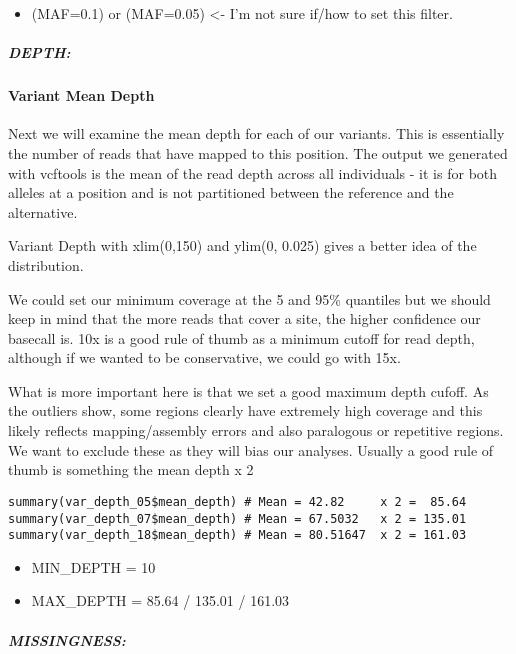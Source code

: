 \documentclass[
]{article}
\providecommand{\tightlist}{%
  \setlength{\itemsep}{0pt}\setlength{\parskip}{0pt}}
\begin{document}
\begin{itemize}
\tightlist
\item
  (MAF=0.1) or (MAF=0.05) \textless- I'm not sure if/how to set this
  filter.
\end{itemize}

\hypertarget{depth-1}{%
\subparagraph{DEPTH:}\label{depth-1}}

\hypertarget{variant-mean-depth}{%
\paragraph{Variant Mean Depth}\label{variant-mean-depth}}

Next we will examine the mean depth for each of our variants. This is
essentially the number of reads that have mapped to this position. The
output we generated with vcftools is the mean of the read depth across
all individuals - it is for both alleles at a position and is not
partitioned between the reference and the alternative.

Variant Depth with xlim(0,150) and ylim(0, 0.025) gives a better idea of
the distribution.

We could set our minimum coverage at the 5 and 95\% quantiles but we
should keep in mind that the more reads that cover a site, the higher
confidence our basecall is. 10x is a good rule of thumb as a minimum
cutoff for read depth, although if we wanted to be conservative, we
could go with 15x.

What is more important here is that we set a good maximum depth cufoff.
As the outliers show, some regions clearly have extremely high coverage
and this likely reflects mapping/assembly errors and also paralogous or
repetitive regions. We want to exclude these as they will bias our
analyses. Usually a good rule of thumb is something the mean depth x 2

\begin{verbatim}
summary(var_depth_05$mean_depth) # Mean = 42.82     x 2 =  85.64
summary(var_depth_07$mean_depth) # Mean = 67.5032   x 2 = 135.01
summary(var_depth_18$mean_depth) # Mean = 80.51647  x 2 = 161.03
\end{verbatim}

\begin{itemize}
\tightlist
\item
  MIN\_DEPTH = 10
\item
  MAX\_DEPTH = 85.64 / 135.01 / 161.03
\end{itemize}

\hypertarget{missingness}{%
\subparagraph{MISSINGNESS:}\label{missingness}}
\end{document}
